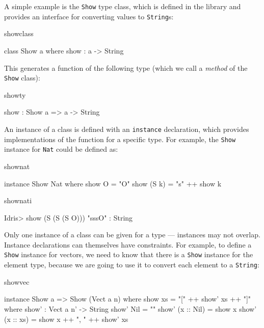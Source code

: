A simple example
is the \texttt{Show} type class, which is defined in the library and
provides an interface for converting values to
\texttt{String}s:

\begin{SaveVerbatim}{showclass}

class Show a where
    show : a -> String

\end{SaveVerbatim}

\noindent
This generates a function of the following type (which we call a \emph{method} of the 
\texttt{Show} class):

\begin{SaveVerbatim}{showty}

show : Show a => a -> String

\end{SaveVerbatim}

An instance of a class
is defined with an \texttt{instance} declaration, which provides implementations of
the function for a specific type. For example, the \texttt{Show} instance for \texttt{Nat}
could be defined as:

\begin{SaveVerbatim}{shownat}

instance Show Nat where
    show O = "O"
    show (S k) = "s" ++ show k

\end{SaveVerbatim}

\begin{SaveVerbatim}{shownati}

Idris> show (S (S (S O))) 
"sssO" : String

\end{SaveVerbatim}

\noindent
Only one instance of a class can be given for a type --- instances may not overlap.
Instance declarations can themselves have constraints. For example, to define a
\texttt{Show} instance for vectors, we need to know that there is a \texttt{Show} 
instance for the element type, because we are going to use it to convert each element
to a \texttt{String}:

\begin{SaveVerbatim}{showvec}

instance Show a => Show (Vect a n) where
    show xs = "[" ++ show' xs ++ "]" where
        show' : Vect a n' -> String
        show' Nil        = ""
        show' (x :: Nil) = show x
        show' (x :: xs)  = show x ++ ", " ++ show' xs

\end{SaveVerbatim}

